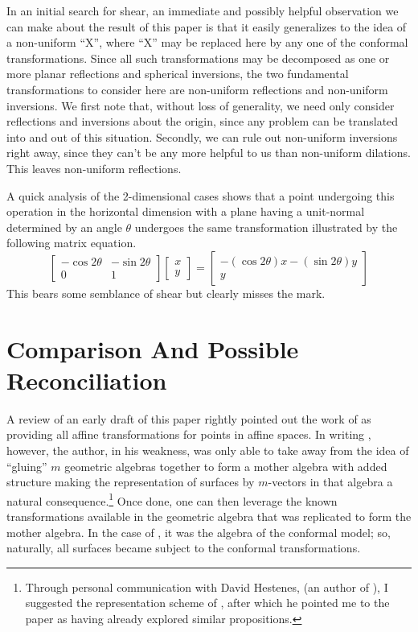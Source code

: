\documentclass{birkjour}
\theoremstyle{definition}
\theoremstyle{remark}
\numberwithin{equation}{section}
\begin{document}
In an initial search for shear, an immediate and possibly helpful observation we can make about the result of this paper is that it
easily generalizes to the idea of a non-uniform ``X'', where ``X'' may be replaced here
by any one of the conformal transformations.  Since all such transformations may be
decomposed as one or more planar reflections and spherical inversions, the two fundamental
transformations to consider here are non-uniform reflections and non-uniform inversions.
We first note that, without loss of generality, we need only consider reflections and inversions
about the origin, since any problem can be translated into and out of this situation.
Secondly, we can rule out non-uniform inversions right away, since they can't be any more helpful
to us than non-uniform dilations.  This leaves non-uniform reflections.

A quick analysis of the 2-dimensional cases shows that a point undergoing this operation
in the horizontal dimension with a plane having a unit-normal determined by an angle $\theta$ undergoes the same
transformation illustrated by the following matrix equation.
\begin{equation*}
\left[\begin{array}{cc} -\cos 2\theta & -\sin 2\theta \\ 0 & 1 \end{array}\right]
\left[\begin{array}{c} x \\ y \end{array}\right] =
\left[\begin{array}{c} -(\cos 2\theta)x - (\sin 2\theta)y \\ y \end{array}\right]
\end{equation*}
This bears some semblance of shear but clearly misses the mark.

\section{Comparison And Possible Reconciliation}

A review of an early draft of this paper rightly pointed out the work of \cite{DoranHestenes93} as providing
all affine transformations for points in affine spaces.
In writing \cite{Parkin13}, however, the author, in his weakness, was only able to take away from \cite{DoranHestenes93}
the idea of ``gluing'' $m$ geometric algebras together to form a mother algebra
with added structure making the representation of surfaces by $m$-vectors in
that algebra a natural consequence.\footnote{Through personal communication
with David Hestenes, (an author of \cite{DoranHestenes93}), I suggested the representation scheme of \cite{Parkin13}, after which he pointed me
to the paper \cite{DoranHestenes93} as having already explored similar propositions.}  Once done, one can then leverage the known transformations
available in the geometric algebra that was replicated to form the mother algebra.
In the case of \cite{Parkin13}, it was the algebra of the conformal model; so, naturally, all surfaces
became subject to the conformal transformations.
\end{document}
